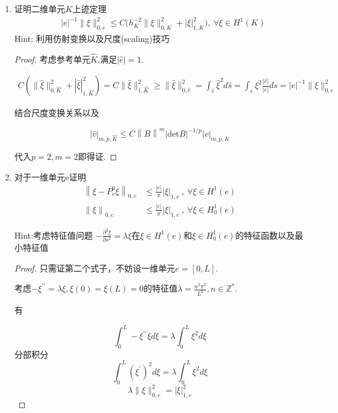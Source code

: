 \documentclass[12pt,a4paper]{article}
\begin{document}
	\begin{enumerate}
		\item 证明二维单元$K$上迹定理
		$$\begin{aligned}&|e|^{-1}\|\xi\|_{0,e}^{2}\leq C\Big(h_{K}^{-2}\|\xi\|_{0,K}^{2}+|\xi|_{1,K}^{2}\Big),\:\forall\xi\in H^{1}(K)\end{aligned}$$
		Hint: 利用仿射变换以及尺度(scaling)技巧
		
		\begin{proof}
			考虑参考单元$\hat{K}$,满足$|\hat{e}|=1$.
			
			\begin{equation*}
				\begin{aligned}
					C(\|\hat{\xi}\|_{0,\hat{K}}^{2}+|\hat{\xi}|_{1,\hat{K}}^{2}) = C\|\hat{\xi}\|_{1,\hat{K}}^2 \geq \|\hat{\xi}\|^2_{0,\hat{e}} = \int_{\hat{e}} \hat{\xi}^2 d\hat{s} = \int_{e}  \xi^2 \frac{|\hat{e}|}{|e|} ds = |e|^{-1}\|\xi\|_{0,e}^{2} 
				\end{aligned}
			\end{equation*}
			
			结合尺度变换关系以及
			
			$$
			|\hat{v}|_{m,p,\hat{K}}\leq C\left\|B\right\|^m|\mathrm{det}B|^{-1/p}|v|_{m,p,K}
			$$
			
			代入$p = 2, m= 2$即得证.
			
		\end{proof}
		
		\item 对于一维单元e证明
		$$\begin{aligned}\left\|\xi-P_{e}^{0}\xi\right\|_{0,e}&\leq\frac{|e|}\pi|\xi|_{1,e}\:,\:\forall\xi\in H^1(e)\\\left\|\xi\right\|_{0,e}&\leq\frac{|e|}\pi|\xi|_{1,e}\:,\:\forall\xi\in H_0^1(e)\end{aligned}$$
		
		Hint:考虑特征值问题 $-\frac{\partial^2 \xi}{\partial s^2} = \lambda \xi$在$\xi \in H^1(e)$和$\xi \in H_0^1(e)$的特征函数以及最小特征值
		
		\begin{proof}
			
			只需证第二个式子，不妨设一维单元$e = [0,L]$.
			
			考虑$-\xi ^{\prime\prime} = \lambda \xi, \xi(0) = \xi(L) = 0$的特征值$\lambda = \displaystyle \frac{n^2 \pi^2}{L^2} , n \in \mathbb{Z^*}$.
			
			有
			
			$$\int_0^L - \xi^{\prime\prime} \xi d\xi =\lambda \int_0^L \xi^2 d\xi$$
			分部积分
			$$\int_0^L (\xi^{\prime})^2 d\xi  =\lambda \int_0^L \xi^2 d\xi  $$
			$$\lambda \|\xi\|_{0,e}^2 = |\xi|_{1,e}^2$$
			

\end{proof}
\end{enumerate}
\end{document}
